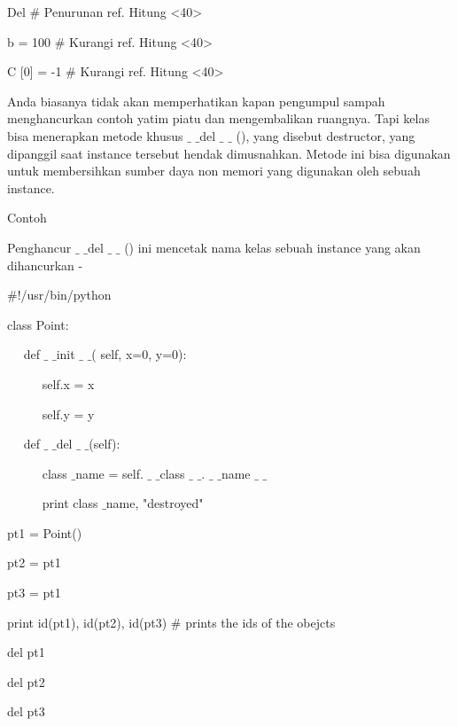 \documentclass[a4paper,12pt]{report}
\begin{document}
\vspace{12pt}
\noindent 
Del  $  \#  $ Penurunan ref. Hitung <40> \par
\noindent 
b = 100  $  \#  $ Kurangi ref. Hitung <40> \par
\noindent 
C [0] = -1  $  \#  $ Kurangi ref. Hitung <40> \par
\vspace{12pt}
\noindent 
Anda biasanya tidak akan memperhatikan kapan pengumpul sampah menghancurkan contoh yatim piatu dan mengembalikan ruangnya. Tapi kelas bisa menerapkan metode khusus  $  \_  $ $  \_  $del  $  \_  $ $  \_  $ (), yang disebut destructor, yang dipanggil saat instance tersebut hendak dimusnahkan. Metode ini bisa digunakan untuk membersihkan sumber daya non memori yang digunakan oleh sebuah instance. \par
\noindent 
Contoh \par
\vspace{12pt}
\noindent 
Penghancur  $  \_  $ $  \_  $del  $  \_  $ $  \_  $ () ini mencetak nama kelas sebuah instance yang akan dihancurkan - \par
\noindent 
 $  \#  $!/usr/bin/python \par
\vspace{12pt}
\noindent 
class Point: \par
\noindent 
~~ def  $  \_  $ $  \_  $init $  \_  $ $  \_  $( self, x=0, y=0): \par
\noindent 
~~~~~ self.x = x \par
\noindent 
~~~~~ self.y = y \par
\noindent 
~~ def  $  \_  $ $  \_  $del $  \_  $ $  \_  $(self): \par
\noindent 
~~~~~ class $  \_  $name = self. $  \_  $ $  \_  $class $  \_  $ $  \_  $. $  \_  $ $  \_  $name $  \_  $ $  \_  $ \par
\noindent 
~~~~~ print class $  \_  $name, "destroyed" \par
\vspace{12pt}
\noindent 
pt1 = Point() \par
\noindent 
pt2 = pt1 \par
\noindent 
pt3 = pt1 \par
\noindent 
print id(pt1), id(pt2), id(pt3)  $  \#  $ prints the ids of the obejcts \par
\noindent 
del pt1 \par
\noindent 
del pt2 \par
\noindent 
del pt3 \par
\vspace{12pt}
\end{document}
